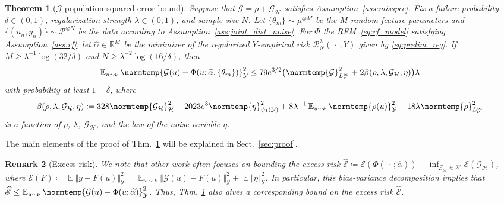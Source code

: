 \documentclass{article}
\theoremstyle{plain}
\newtheorem{theorem}{Theorem}[section]
\theoremstyle{my_def}
\theoremstyle{my_rem}
\newtheorem{remark}[theorem]{Remark}
\numberwithin{equation}{section}
\numberwithin{theorem}{section}%
\newcommand{\R}{\mathbb{R}}
\newcommand{\E}{\mathbb{E}}
\newcommand{\scrE}{\mathscr{E}}
\newcommand{\scrR}{\mathscr{R}}
\newcommand{\cG}{\mathcal{G}}
\newcommand{\cH}{\mathcal{H}}
\newcommand{\cP}{\mathcal{P}}
\newcommand{\cY}{\mathcal{Y}}
\newcommand{\norm}{\normtemp}
\renewcommand{\hat}{\widehat}
\newcommand{\slot}{{\,\cdot\,}}
\newcommand{\defeq}{\coloneqq} %
\renewcommand{\E}{\operatorname{\mathbb{E}}} %
\newcommand{\al}{\alpha}
\newcommand{\Th}{{\{\theta_m\}}}
\newcommand{\GH}{\cG_{\cH}}
\newcommand{\alhat}{\hat{\al}}
\begin{document}
\begin{theorem}[$\cG$-population squared error bound]\label{thm:error_bound_total_G}
    Suppose that $\cG = \rho+\GH $ satisfies Assumption~\ref{ass:misspec}. Fix a failure probability $\delta\in(0,1)$, regularization strength $\lambda\in(0,1)$, and sample size $N$. Let $\Th\sim\mu^{\otimes M}$ be the $M$ random feature parameters and $\{(u_n,y_n)\}\sim\cP^{\otimes N}$ be the data according to Assumption~\ref{ass:joint_dist_noise}. For $\Phi$ the RFM~\eqref{eq:rf_model} satisfying Assumption~\ref{ass:rf}, let $\alhat
    \in \R^M$ be the minimizer of the regularized $Y$-empirical risk $\scrR_N^\lambda(\slot;Y)$ given by \eqref{eq:prelim_reg}. If $M \ge \lambda^{-1}\log(32/\delta)$ and $N\geq \lambda^{-2}\log(16/\delta)$, then
    \begin{equation}\label{eq:error_bound_total_G}
        \E_{u\sim\nu}\norm{\cG(u)-\Phi(u;\alhat,\Th)}_{\cY}^2  \leq 79e^{3/2}\bigl(\norm{\cG}_{L^\infty_\nu}^2 + 2\beta(\rho,\lambda,\GH,\eta)\bigr)\lambda
    \end{equation}
    with probability at least $1-\delta$, where
    \begin{equation}\label{eq:alphabd_noisy_const}
        \beta(\rho,\lambda,\GH,\eta) \defeq 328 \norm{\GH}_\cH^2
            + 2023e^{3}\norm{\eta}_{\psi_1(\cY)}^2 + 8\lambda^{-1}\E_{u\sim\nu}\norm{\rho(u)}_{\cY}^2   + 18\lambda \norm{\rho}_{L^\infty_\nu}^2
    \end{equation}
    is a function of $\rho$, $\lambda$, $\GH$, and the law of the noise variable $\eta$.
\end{theorem}
The main elements of the proof of Thm.~\ref{thm:error_bound_total_G} will be explained in Sect.~\ref{sec:proof}.

\begin{remark}[Excess risk]
We note that other work \cite{li2021towards,RR2008,rudi2017generalization} often focuses on bounding the \emph{excess risk} $\hat{\scrE} \defeq \scrE(\Phi(\slot;\alhat)) - \inf_{\GH\in \cH} \scrE(\GH)$, where $\scrE(F) \defeq \E \Vert y - F(u) \Vert_\cY^2 = \E_{u\sim \nu}\Vert \cG(u) - F(u)\Vert_\cY^2 + \E \Vert \eta\Vert_\cY^2$. In particular, this bias-variance decomposition implies that $\hat{\scrE} \le \E_{u\sim\nu}\norm{\cG(u)-\Phi(u;\alhat)}_{\cY}^2$. Thus, Thm. \ref{thm:error_bound_total_G} also gives a corresponding bound on the excess risk $\hat{\scrE}$.
\end{remark}
\end{document}
